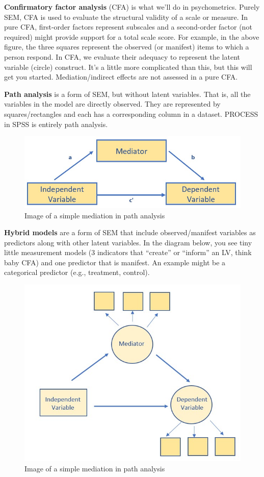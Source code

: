 \documentclass[
  11pt,
]{book}
\begin{document}
\textbf{Confirmatory factor analysis} (CFA) is what we'll do in psychometrics. Purely SEM, CFA is used to evaluate the structural validity of a scale or measure. In pure CFA, first-order factors represent subscales and a second-order factor (not required) might provide support for a total scale score. For example, in the above figure, the three squares represent the observed (or manifest) items to which a person respond. In CFA, we evaluate their adequacy to represent the latent variable (circle) construct. It's a little more complicated than this, but this will get you started. Mediation/indirect effects are not assessed in a pure CFA.

\textbf{Path analysis} is a form of SEM, but without latent variables. That is, all the variables in the model are directly observed. They are represented by squares/rectangles and each has a corresponding column in a dataset. PROCESS in SPSS is entirely path analysis.

\begin{figure}
\centering
\includegraphics{images/SimpleMod/SimpleMed.jpg}
\caption{Image of a simple mediation in path analysis}
\end{figure}

\textbf{Hybrid models} are a form of SEM that include observed/manifest variables as predictors along with other latent variables. In the diagram below, you see tiny little measurement models (3 indicators that ``create'' or ``inform'' an LV, think baby CFA) and one predictor that is manifest. An example might be a categorical predictor (e.g., treatment, control).

\begin{figure}
\centering
\includegraphics{images/SimpleMod/HybridMed.jpg}
\caption{Image of a simple mediation in path analysis}
\end{figure}
\end{document}
